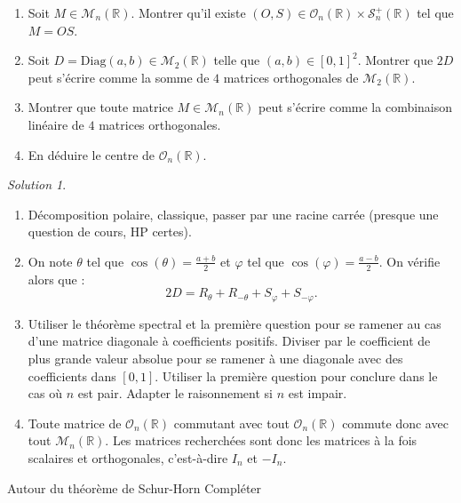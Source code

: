 \documentclass[french]{book}
\newcommand{\R}{\mathbb{R}}
\theoremstyle{definition}
\theoremstyle{remark}
\newtheorem*{sol}{Solution}
\begin{document}
\begin{exo}[2]{}
	\begin{enumerate}
		\item Soit $M\in\mathcal{M}_n(\R)$. Montrer qu'il existe $(O,S)\in\mathcal{O}_n(\R)\times\mathcal{S}_n^+(\R)$ tel que $M=OS$.
		\item Soit $D=\text{Diag}(a,b)\in\mathcal{M}_2(\R)$ telle que $(a,b)\in[0,1]^2$. Montrer que $2D$ peut s'écrire comme la somme de $4$ matrices orthogonales de $\mathcal{M}_2(\R)$.
		\item Montrer que toute matrice $M\in\mathcal{M}_n(\R)$ peut s'écrire comme la combinaison linéaire de $4$ matrices orthogonales.
		\item En déduire le centre de $\mathcal{O}_n(\R)$.
	\end{enumerate}
\end{exo}
\begin{sol}
	\begin{enumerate}
		\item Décomposition polaire, classique, passer par une racine carrée (presque une question de cours, HP certes).
		\item On note $\theta$ tel que $\cos(\theta)=\displaystyle\frac{a+b}{2}$ et $\varphi$ tel que $\cos(\varphi)=\displaystyle\frac{a-b}{2}$. On vérifie alors que :
		$$2D=R_\theta+R_{-\theta}+S_{\varphi}+S_{-\varphi}.$$
		\item Utiliser le théorème spectral et la première question pour se ramener au cas d'une matrice diagonale à coefficients positifs. Diviser par le coefficient de plus grande valeur absolue pour se ramener à une diagonale avec des coefficients dans $[0,1]$. Utiliser la première question pour conclure dans le cas où $n$ est pair. Adapter le raisonnement si $n$ est impair.
		\item Toute matrice de $\mathcal{O}_n(\R)$ commutant avec tout $\mathcal{O}_n(\R)$ commute donc avec tout $\mathcal{M}_n(\R)$. Les matrices recherchées sont donc les matrices à la fois scalaires et orthogonales, c'est-à-dire $I_n$ et $-I_n$.
	\end{enumerate}
\end{sol}

\begin{exo}[3]{Autour du théorème de Schur-Horn}
	Compléter
\end{exo}
\end{document}
